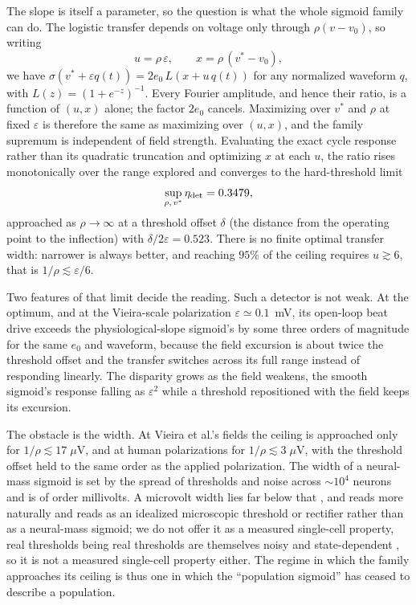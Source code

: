 \documentclass[11pt,a4paper]{article}
\newcommand{\Sig}{\sigma}
\providecommand{\DIFaddtex}[1]{{\protect\color{blue} \sf #1}} %
\providecommand{\DIFdeltex}[1]{{\protect\color{red} \scriptsize #1}} %
\providecommand{\DIFaddbegin}{} %
\providecommand{\DIFaddend}{} %
\providecommand{\DIFdelbegin}{} %
\providecommand{\DIFdelend}{} %
\providecommand{\DIFadd}[1]{\texorpdfstring{\DIFaddtex{#1}}{#1}} %
\providecommand{\DIFdel}[1]{\texorpdfstring{\DIFdeltex{#1}}{}} %
\begin{document}
The slope is itself a parameter, so the question is what the whole sigmoid family can do.
The logistic transfer depends on voltage only through $\rho(v-v_0)$, so writing
\begin{equation}
u=\rho\,\varepsilon,\qquad x=\rho\,(v^*-v_0),
\label{eq:reduced}
\end{equation}
we have $\Sig(v^*+\varepsilon q(t))=2e_0\,L(x+u\,q(t))$ for any normalized waveform $q$,
with $L(z)=(1+e^{-z})^{-1}$. Every Fourier amplitude, and hence their ratio, is a function
of $(u,x)$ alone; the factor $2e_0$ cancels. Maximizing over $v^*$ and $\rho$ at fixed
$\varepsilon$ is therefore the same as maximizing over $(u,x)$, and the family supremum is
independent of field strength. Evaluating the exact cycle response rather than its
quadratic truncation and optimizing $x$ at each $u$, the ratio rises monotonically over the
range explored and converges to the hard-threshold limit
\begin{equation}
\sup_{\rho,\,v^*}\eta_{\rm det}=0.3479 ,
\label{eq:etasup}
\end{equation}
approached as $\rho\to\infty$ at a threshold offset $\delta$ (the distance from the
operating point to the inflection) with $\delta/2\varepsilon=0.523$. There is no
finite optimal transfer width: narrower is always better, and reaching $95\%$ of the ceiling
requires $u\gtrsim6$, that is $1/\rho\lesssim\varepsilon/6$.

\DIFdelbegin \DIFdel{Two features of that limit decide the reading. }\DIFdelend Such a detector is not weak. At the optimum,
and at the Vieira-scale polarization $\varepsilon\!\simeq\!0.1$~mV, its open-loop beat drive
exceeds the physiological-slope sigmoid's by some three orders of magnitude for the same
$e_0$ and waveform, because the field excursion is about twice the threshold offset and the
transfer switches across its full range instead of responding linearly. The disparity grows
as the field weakens, the smooth sigmoid's response falling as $\varepsilon^2$ while a
threshold repositioned with the field keeps its excursion.
\DIFaddbegin 

\DIFaddend The obstacle is the width.
At Vieira et al.'s fields the ceiling is approached only for $1/\rho\lesssim17\;\mu$V, and
at human polarizations for $1/\rho\lesssim3\;\mu$V, with the threshold offset held to the
same order as the applied polarization. The width of a neural-mass sigmoid is set by the
spread of thresholds and noise across $\sim10^4$ neurons and is of order millivolts. A
microvolt width lies far below that \DIFdelbegin \DIFdel{, and reads more naturally }\DIFdelend \DIFaddbegin \DIFadd{and reads }\DIFaddend as an idealized microscopic threshold or
rectifier \DIFaddbegin \DIFadd{rather }\DIFaddend than as a neural-mass sigmoid; \DIFdelbegin \DIFdel{we do not offer it as a measured
single-cell property, real thresholds being }\DIFdelend \DIFaddbegin \DIFadd{real thresholds are }\DIFaddend themselves noisy and
state-dependent\DIFaddbegin \DIFadd{, so it is not a measured single-cell property either}\DIFaddend . The
regime in which the family approaches its ceiling is thus one in which the ``population
sigmoid'' has ceased to describe a population.
\end{document}
